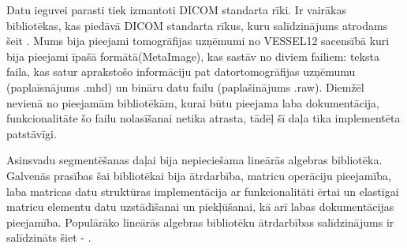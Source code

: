 Datu ieguvei parasti tiek izmantoti DICOM standarta rīki. Ir vairākas bibliotēkas, kas piedāvā DICOM standarta rīkus, kuru salīdzinājums atrodams šeit \cite{dicombibcomp}. Mums bija pieejami tomogrāfijas uzņēmumi no VESSEL12 sacensībā kuri bija pieejami īpašā formātā(MetaImage), kas sastāv no diviem failiem: teksta faila, kas satur aprakstošo informāciju pat datortomogrāfijas uzņēmumu (paplaīsnājums .mhd) un bināru datu failu (paplašinājums .raw). Diemžēl nevienā no pieejamām bibliotēkām, kurai būtu pieejama laba dokumentācija, funkcionalitāte šo failu nolasīšanai netika atrasta, tādēļ šī daļa tika implementēta patstāvīgi.

Asinsvadu segmentēšanas daļai bija nepieciešama lineārās algebras bibliotēka. Galvenās prasības šai bibliotēkai bija ātrdarbība, matricu operāciju pieejamība, laba matricas datu struktūras implementācija ar funkcionalitāti ērtai un elastīgai matricu elementu datu uzstādīšanai un piekļūšanai, kā arī labas dokumentācijas pieejamība. Populārāko lineārās algebras bibliotēku ātrdarbības salīdzinājums ir salīdzināts šiet - \cite{linearlibcomp}.